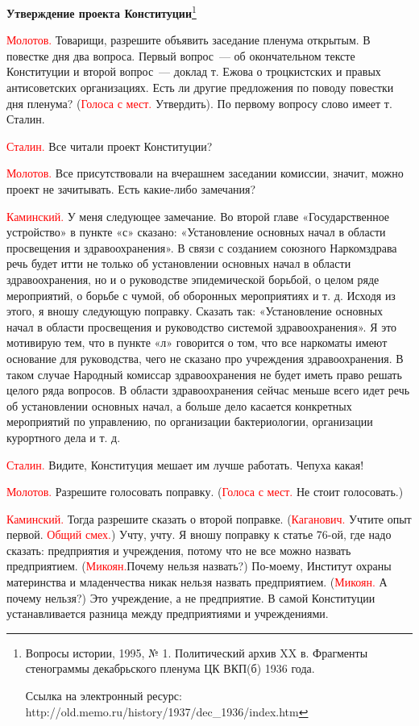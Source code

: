 \documentclass{kursa4}
\begin{document}
      \textbf{{Утверждение проекта Конституции}}\footnote{ Вопросы истории, 1995, № 1. Политический архив XX в. Фрагменты стенограммы декабрьского пленума ЦК ВКП(б) 1936 года.\par Ссылка на электронный ресурс: http://old.memo.ru/history/1937/dec\_1936/index.htm}

      \textcolor{red}{Молотов.}{
      Товарищи, разрешите объявить заседание пленума открытым. В повестке дня два вопроса. Первый вопрос~--- об окончательном тексте Конституции и второй вопрос~--- доклад т. Ежова о троцкистских и правых антисоветских организациях. Есть ли другие предложения по поводу повестки дня пленума? (}\textcolor{red}{Голоса с мест.}{ Утвердить). По первому вопросу слово имеет т. Сталин.}

      \textcolor{red}{Сталин.}{
      Все читали проект Конституции?}

      \textcolor{red}{Молотов.}{
      Все присутствовали на вчерашнем заседании комиссии, значит, можно проект не зачитывать. Есть какие-либо замечания?}

      \textcolor{red}{Каминский.}{
      У меня следующее замечание. Во второй главе «Государственное устройство» в пункте «с» сказано: «Установление основных начал в области просвещения и здравоохранения». В связи с созданием союзного Наркомздрава речь будет итти не только об установлении основных начал в области здравоохранения, но и о руководстве эпидемической борьбой, о целом ряде мероприятий, о борьбе с чумой, об оборонных мероприятиях и т. д. Исходя из этого, я вношу следующую поправку. Сказать так: «Установление основных начал в области просвещения и руководство системой здравоохранения». Я это мотивирую тем, что в пункте «л» говорится о том, что все наркоматы имеют основание для руководства, чего не сказано про учреждения здравоохранения. В таком случае Народный комиссар здравоохранения не будет иметь право решать целого ряда вопросов. В области здравоохранения сейчас меньше всего идет речь об установлении основных начал, а больше дело касается конкретных мероприятий по управлению, по организации бактериологии, организации курортного дела и т. д.}

      \textcolor{red}{Сталин.}{
      Видите, Конституция мешает им лучше работать. Чепуха какая!}

      \textcolor{red}{Молотов.}{
      Разрешите голосовать поправку. (}\textcolor{red}{Голоса с мест.}{ Не стоит голосовать.)}

      \textcolor{red}{Каминский.}{
      Тогда разрешите сказать о второй поправке. (}\textcolor{red}{Каганович.}{
      Учтите опыт первой.
      }\textcolor{red}{Общий смех.}{) Учту, учту. Я вношу поправку к статье 76-ой, где надо сказать: предприятия и учреждения, потому что не все можно назвать предприятием. (}\textcolor{red}{Микоян.}{Почему нельзя назвать?) По-моему, Институт охраны материнства и младенчества никак нельзя назвать предприятием. (}\textcolor{red}{Микоян.}{
      А почему нельзя?) Это учреждение, а не предприятие. В самой Конституции устанавливается разница между предприятиями и учреждениями.}
\end{document}

